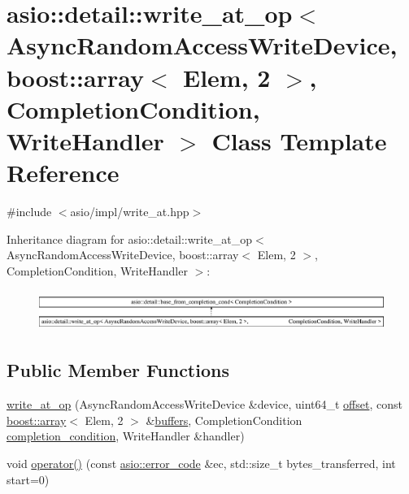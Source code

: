 \hypertarget{classasio_1_1detail_1_1write__at__op_3_01_async_random_access_write_device_00_01boost_1_1array_3e439bc739a816bec12c3cd7d54fe10a0}{}\section{asio\+:\+:detail\+:\+:write\+\_\+at\+\_\+op$<$ Async\+Random\+Access\+Write\+Device, boost\+:\+:array$<$ Elem, 2 $>$, Completion\+Condition, Write\+Handler $>$ Class Template Reference}
\label{classasio_1_1detail_1_1write__at__op_3_01_async_random_access_write_device_00_01boost_1_1array_3e439bc739a816bec12c3cd7d54fe10a0}


{\ttfamily \#include $<$asio/impl/write\+\_\+at.\+hpp$>$}

Inheritance diagram for asio\+:\+:detail\+:\+:write\+\_\+at\+\_\+op$<$ Async\+Random\+Access\+Write\+Device, boost\+:\+:array$<$ Elem, 2 $>$, Completion\+Condition, Write\+Handler $>$\+:\begin{figure}[H]
\begin{center}
\leavevmode
\includegraphics[height=1.323877cm]{classasio_1_1detail_1_1write__at__op_3_01_async_random_access_write_device_00_01boost_1_1array_3e439bc739a816bec12c3cd7d54fe10a0}
\end{center}
\end{figure}
\subsection*{Public Member Functions}
\begin{DoxyCompactItemize}
\item 
\hyperlink{classasio_1_1detail_1_1write__at__op_3_01_async_random_access_write_device_00_01boost_1_1array_3e439bc739a816bec12c3cd7d54fe10a0_a6ecc1a9d52efc62e6bb565ee23cea8fe}{write\+\_\+at\+\_\+op} (Async\+Random\+Access\+Write\+Device \&device, uint64\+\_\+t \hyperlink{group__async__read__at_ga8dcdb41a4adfd6fe5322b5dd666d9f29}{offset}, const \hyperlink{classboost_1_1array}{boost\+::array}$<$ Elem, 2 $>$ \&\hyperlink{group__async__read_ga54dede45c3175148a77fe6635222c47d}{buffers}, Completion\+Condition \hyperlink{group__async__read_gae2e215d5013596cc2b385bb6c13fa518}{completion\+\_\+condition}, Write\+Handler \&handler)
\item 
void \hyperlink{classasio_1_1detail_1_1write__at__op_3_01_async_random_access_write_device_00_01boost_1_1array_3e439bc739a816bec12c3cd7d54fe10a0_ade057c25b25c3b84b926d2cd264795f7}{operator()} (const \hyperlink{classasio_1_1error__code}{asio\+::error\+\_\+code} \&ec, std\+::size\+\_\+t bytes\+\_\+transferred, int start=0)
\end{DoxyCompactItemize}
